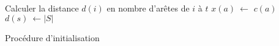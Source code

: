 \begin{algorithm}
	\begin{algorithmic}[1]
				\STATE Calculer la distance $d(i)$ en nombre d'arêtes de $i$ à $t$  
			\ENDFOR
				\STATE $x(a)\ \leftarrow$ $c(a)$  
			\ENDFOR
			\STATE $d(s)\ \leftarrow |S|$ 
	\end{algorithmic}
	\caption{Procédure d'initialisation}
	\label{proc_init}
\end{algorithm}

